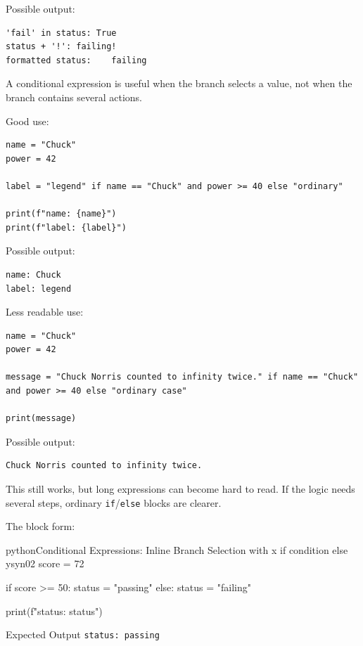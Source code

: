 \documentclass[a4paper,twoside]{report}
\begin{document}
Possible output:

\begin{verbatim}
'fail' in status: True
status + '!': failing!
formatted status:    failing
\end{verbatim}

A conditional expression is useful when the branch selects a value, not when the branch contains several actions.

Good use:

\begin{verbatim}
name = "Chuck"
power = 42

label = "legend" if name == "Chuck" and power >= 40 else "ordinary"

print(f"name: {name}")
print(f"label: {label}")
\end{verbatim}

Possible output:

\begin{verbatim}
name: Chuck
label: legend
\end{verbatim}

Less readable use:

\begin{verbatim}
name = "Chuck"
power = 42

message = "Chuck Norris counted to infinity twice." if name == "Chuck" and power >= 40 else "ordinary case"

print(message)
\end{verbatim}

Possible output:

\begin{verbatim}
Chuck Norris counted to infinity twice.
\end{verbatim}

This still works, but long expressions can become hard to read. If the logic needs several steps, ordinary \texttt{if}/\texttt{else} blocks are clearer.

The block form:

\begin{codebox}[]{python}{Conditional Expressions: Inline Branch Selection with x if condition else y}{syn02}
score = 72

if score >= 50:
    status = "passing"
else:
    status = "failing"

print(f"status: {status}")
\end{codebox}


\begin{iobox}{Expected Output}
\texttt{status: passing} \\
\end{iobox}
\end{document}
